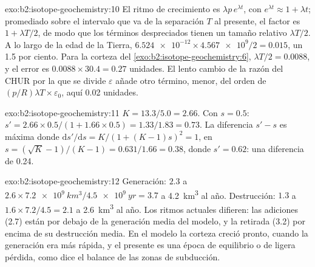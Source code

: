 \begin{solution}{exo:b2:isotope-geochemistry:10}
El ritmo de crecimiento es $\lambda p\,e^{\lambda t}$, con $e^{\lambda t} \approx 1 + \lambda t$;
promediado sobre el intervalo que va de la separación $T$ al presente, el factor es
$1 + \lambda T/2$, de modo que los términos despreciados tienen un tamaño relativo $\lambda T/2$. A lo largo de la
edad de la Tierra, $\num{6.524e-12}\times\num{4.567e9}/2 = 0.015$, un 1.5 por ciento. Para la
corteza del \cref{exo:b2:isotope-geochemistry:6}, $\lambda T/2 = 0.0088$, y el error es $0.0088\times30.4 = 0.27$
unidades. El lento cambio de la razón del CHUR por la que se divide $\varepsilon$ añade
otro término, menor, del orden de $(p/R)\lambda T \times \varepsilon_0$, aquí 0.02 unidades.
\end{solution}

\begin{solution}{exo:b2:isotope-geochemistry:11}
$K = 13.3/5.0 = 2.66$. Con $s = 0.5$: $s' = 2.66\times0.5/(1 + 1.66\times0.5) =
1.33/1.83 = 0.73$. La diferencia $s' - s$ es máxima donde
$\mathrm{d}s'/\mathrm{d}s = K/(1+(K-1)s)^2 = 1$, en $s = (\sqrt K - 1)/(K-1) =
0.631/1.66 = 0.38$, donde $s' = 0.62$: una diferencia de 0.24.
\end{solution}

\begin{solution}{exo:b2:isotope-geochemistry:12}
Generación: $2.3$ a $2.6\times\qty{7.2e9}{km^3}/\qty{4.5e9}{yr} = 3.7$ a
\qty{4.2}{km^3} al año. Destrucción: $1.3$ a $1.6\times7.2/4.5 = 2.1$ a
\qty{2.6}{km^3} al año. Los ritmos actuales difieren: las adiciones (2.7) están por debajo de la
generación media del modelo, y la retirada (3.2) por encima de su destrucción media. En el modelo la corteza creció
pronto, cuando la generación era más rápida, y el presente es una época de equilibrio o de ligera
pérdida, como dice el balance de las zonas de subducción.
\end{solution}

